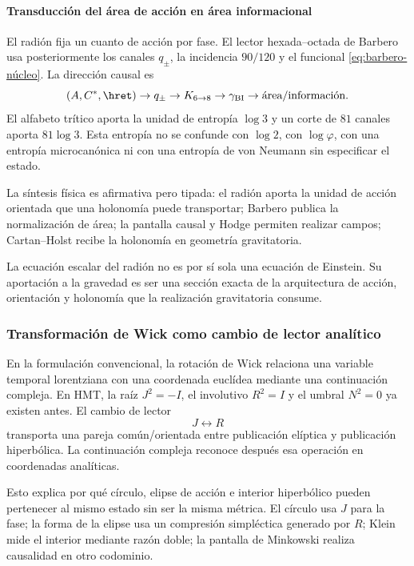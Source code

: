 \paragraph{Transducción del área de acción en área informacional}

El radión fija un cuanto de acción por fase. El lector hexada--octada de
Barbero usa posteriormente los canales \(q_\pm\), la incidencia \(90/120\) y
el funcional \eqref{eq:barbero-núcleo}. La dirección causal es
\[
(A,C^*,\hret)\to q_\pm\to K_{6\to8}
\to\gamma_{\mathrm{BI}}\to\text{área/información}.
\]
El alfabeto trítico aporta la unidad de entropía \(\log3\) y un corte de
\(81\) canales aporta \(81\log3\). Esta entropía no se confunde con
\(\log2\), con \(\log\varphi\), con una entropía microcanónica ni con una
entropía de von Neumann sin especificar el estado.

La síntesis física es afirmativa pero tipada: el radión aporta la unidad de
acción orientada que una holonomía puede transportar; Barbero publica la
normalización de área; la pantalla causal y Hodge permiten realizar campos;
Cartan--Holst recibe la holonomía en geometría gravitatoria.

\begin{statusbox}
La ecuación escalar del radión no es por sí sola una ecuación de Einstein. Su
aportación a la gravedad es ser una sección exacta de la arquitectura de
acción, orientación y holonomía que la realización gravitatoria consume.
\end{statusbox}

\subsubsection{Transformación de Wick como cambio de lector analítico}

En la formulación convencional, la rotación de Wick relaciona una variable
temporal lorentziana con una coordenada euclídea mediante una continuación
compleja. En HMT, la raíz \(J^2=-I\), el involutivo \(R^2=I\) y el umbral
\(N^2=0\) ya existen antes. El cambio de lector
\[
J\longleftrightarrow R
\]
transporta una pareja común/orientada entre publicación elíptica y
publicación hiperbólica. La continuación compleja reconoce después esa
operación en coordenadas analíticas.

Esto explica por qué círculo, elipse de acción e interior hiperbólico pueden
pertenecer al mismo estado sin ser la misma métrica. El círculo usa \(J\) para
la fase; la forma de la elipse usa un compresión simpléctica generado por \(R\); Klein mide
el interior mediante razón doble; la pantalla de Minkowski realiza causalidad
en otro codominio.

